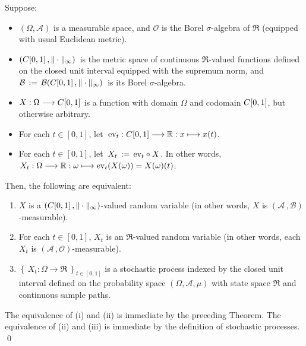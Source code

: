 \vskip 0.8cm
\begin{theorem}
\label{CzoRVStochasticProcessEquivalence}
\mbox{}\vskip 0.1cm
\noindent
Suppose:
\begin{itemize}
\item	$\left(\Omega,\mathcal{A}\right)$ is a measurable space, and
		$\mathcal{O}$ is the Borel $\sigma$-algebra of $\Re$ (equipped with usual Euclidean metric).
\item	$(C[0,1]\,,\Vert\cdot\Vert_{\infty})$\, is the metric space
		of continuous $\Re$-valued functions defined on the closed unit interval
		equipped with the supremum norm, and
		\,$\mathcal{B} \,:=\, \mathcal{B}(C[0,1]\,,\Vert\cdot\Vert_{\infty})$\, is its Borel $\sigma$-algebra.
\item	$X : \Omega \longrightarrow C[0,1]$ is a function with domain $\Omega$
		and codomain $C[0,1]$, but otherwise arbitrary.
\item	For each $t \in [0,1]$, let \,$\textnormal{ev}_{t} : C[0,1] \longrightarrow \mathbb{R} : x \longmapsto x(t)$.
\item 	For each $t \in [0,1]$, let \,$X_{t} \,:=\, \textnormal{ev}_{t} \circ X$.
		In other words, $X_{t} : \Omega \longrightarrow \mathbb{R} : \omega \longmapsto \textnormal{ev}_{t}(X(\omega)) = X(\omega)(t)$.
\end{itemize}
Then, the following are equivalent:
\begin{enumerate}
\item	$X$ is a $(C[0,1]\,,\Vert\cdot\Vert_{\infty})$-valued random variable
		(in other words, $X$ is $(\mathcal{A}\,,\mathcal{B})$-measurable).
\item	For each $t \in [0,1]$, $X_{t}$ is an $\Re$-valued random variable
		(in other words, each $X_{t}$ is $(\mathcal{A}\,,\mathcal{O})$-measurable).
\item	$\left\{\,X_{t}:\Omega\longrightarrow\Re\,\right\}_{t\in[0,1]}$ is a stochastic process
		indexed by the closed unit interval
		defined on the probability space $\left(\Omega,\mathcal{A},\mu\right)$
		with state space $\Re$ and continuous sample paths.
\end{enumerate}
\end{theorem}
\proof
The equivalence of (i) and (ii) is immediate by the preceding Theorem.
The equivalence of (ii) and (iii) is immediate by the definition of stochastic processes.
\qed


\renewcommand{\theenumi}{\roman{enumi}}
\renewcommand{\labelenumi}{\textnormal{(\theenumi)}$\;\;$}


